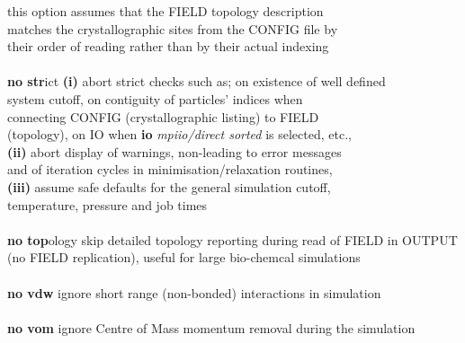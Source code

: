 \begin{tabbing}
\>                                              \> this option assumes that the FIELD topology description \\
\>                                              \> matches the crystallographic sites from the CONFIG file by \\
\>                                              \> their order of reading rather than by their actual indexing \\
\>                                              \> \\
\> {\bf no str}ict                              \> {\bf (i)} abort strict checks such as; on existence of well defined \\
\>                                              \> system cutoff, on contiguity of particles' indices when \\
\>                                              \> connecting CONFIG (crystallographic listing) to FIELD \\
\>                                              \> (topology), on IO when {\bf io} {\em mpiio/direct sorted} is selected, etc., \\
\>                                              \> {\bf (ii)} abort display of warnings, non-leading to error messages \\
\>                                              \> and of iteration cycles in minimisation/relaxation routines, \\
\>                                              \> {\bf (iii)} assume safe defaults for the general simulation cutoff, \\
\>                                              \> temperature, pressure and job times \\
\>                                              \> \\
\> {\bf no top}ology                            \> skip detailed topology reporting during read of FIELD in OUTPUT \\
\>                                              \> (no FIELD replication), useful for large bio-chemcal simulations \\
\>                                              \> \\
\> {\bf no vdw}                                 \> ignore short range (non-bonded) interactions in simulation \\
\>                                              \> \\
\> {\bf no vom}                                 \> ignore Centre of Mass momentum removal during the simulation \\

\end{tabbing}
